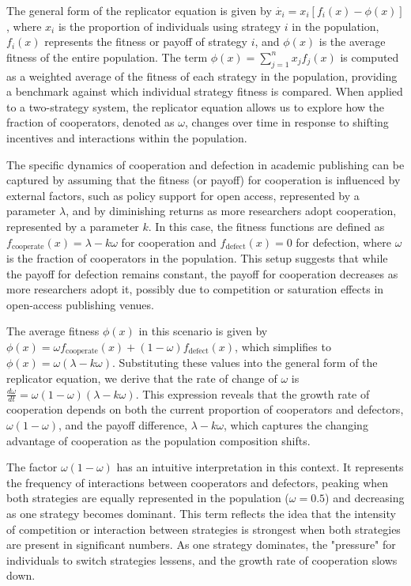 \documentclass[amsfonts, amssymb, prl, superscriptaddress, notitlepage, twocolumn, nofootinbib]{revtex4-2}
\begin{document}
The general form of the replicator equation is given by 
$\dot{x_i} = x_i [f_i(x) - \phi(x)]$, 
where $x_i$ is the proportion of individuals using strategy $i$ in the population, $f_i(x)$ represents the fitness or payoff of strategy $i$, and $\phi(x)$ is the average fitness of the entire population. The term 
$\phi(x) = \sum_{j=1}^n x_j f_j(x)$ 
is computed as a weighted average of the fitness of each strategy in the population, providing a benchmark against which individual strategy fitness is compared. When applied to a two-strategy system, the replicator equation allows us to explore how the fraction of cooperators, denoted as $\omega$, changes over time in response to shifting incentives and interactions within the population.

The specific dynamics of cooperation and defection in academic publishing can be captured by assuming that the fitness (or payoff) for cooperation is influenced by external factors, such as policy support for open access, represented by a parameter $\lambda$, and by diminishing returns as more researchers adopt cooperation, represented by a parameter $k$. In this case, the fitness functions are defined as 
$f_{\text{cooperate}}(x) = \lambda - k \omega$ 
for cooperation and 
$f_{\text{defect}}(x) = 0$ 
for defection, where $\omega$ is the fraction of cooperators in the population. This setup suggests that while the payoff for defection remains constant, the payoff for cooperation decreases as more researchers adopt it, possibly due to competition or saturation effects in open-access publishing venues.

The average fitness $\phi(x)$ in this scenario is given by 
$\phi(x) = \omega f_{\text{cooperate}}(x) + (1 - \omega) f_{\text{defect}}(x)$, 
which simplifies to 
$\phi(x) = \omega (\lambda - k \omega)$. 
Substituting these values into the general form of the replicator equation, we derive that the rate of change of $\omega$ is 
$\frac{d\omega}{dt} = \omega (1 - \omega) (\lambda - k \omega)$. 
This expression reveals that the growth rate of cooperation depends on both the current proportion of cooperators and defectors, $\omega(1 - \omega)$, and the payoff difference, $\lambda - k \omega$, which captures the changing advantage of cooperation as the population composition shifts.

The factor $\omega(1 - \omega)$ has an intuitive interpretation in this context. It represents the frequency of interactions between cooperators and defectors, peaking when both strategies are equally represented in the population ($\omega = 0.5$) and decreasing as one strategy becomes dominant. This term reflects the idea that the intensity of competition or interaction between strategies is strongest when both strategies are present in significant numbers. As one strategy dominates, the "pressure" for individuals to switch strategies lessens, and the growth rate of cooperation slows down.
\end{document}
